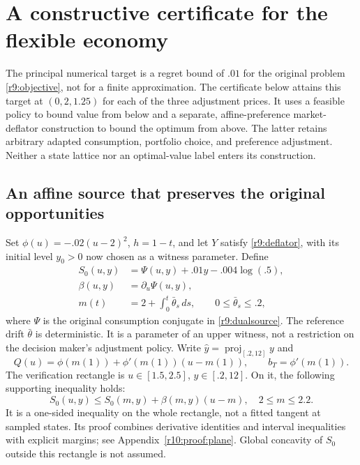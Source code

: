 \section{A constructive certificate for the flexible economy}\label{r10:flexible}
The principal numerical target is a regret bound of $.01$ for the original problem \eqref{r9:objective}, not for a finite approximation. The certificate below attains this target at $(0,2,1.25)$ for each of the three adjustment prices. It uses a feasible policy to bound value from below and a separate, affine-preference market-deflator construction to bound the optimum from above. The latter retains arbitrary adapted consumption, portfolio choice, and preference adjustment. Neither a state lattice nor an optimal-value label enters its construction.

\subsection{An affine source that preserves the original opportunities}
Set $\phi(u)=-.02(u-2)^2$, $h=1-t$, and let $Y$ satisfy \eqref{r9:deflator}, with its initial level $y_0>0$ now chosen as a witness parameter. Define
\begin{align}
 S_0(u,y)&=\Psi(u,y)+.01y-.004\log(.5),\\
 \beta(u,y)&=\partial_u\Psi(u,y),\\
 m(t)&=2+\int_0^t\bar\theta_s\,ds,\qquad 0\leq\bar\theta_s\leq.2,\label{r10:source}
\end{align}
where $\Psi$ is the original consumption conjugate in \eqref{r9:dualsource}. The reference drift $\bar\theta$ is deterministic. It is a parameter of an upper witness, not a restriction on the decision maker's adjustment policy. Write $\widehat y=\operatorname{proj}_{[.2,12]}y$ and
\[
 Q(u)=\phi(m(1))+\phi'(m(1))(u-m(1)),\qquad b_T=\phi'(m(1)).
\]
The verification rectangle is $u\in[1.5,2.5]$, $y\in[.2,12]$. On it, the following supporting inequality holds:
\begin{equation}
 S_0(u,y)\leq S_0(m,y)+\beta(m,y)(u-m),\quad 2\leq m\leq2.2.\label{r10:plane}
\end{equation}
It is a one-sided inequality on the whole rectangle, not a fitted tangent at sampled states. Its proof combines derivative identities and interval inequalities with explicit margins; see Appendix~\ref{r10:proof:plane}. Global concavity of $S_0$ outside this rectangle is not assumed.

